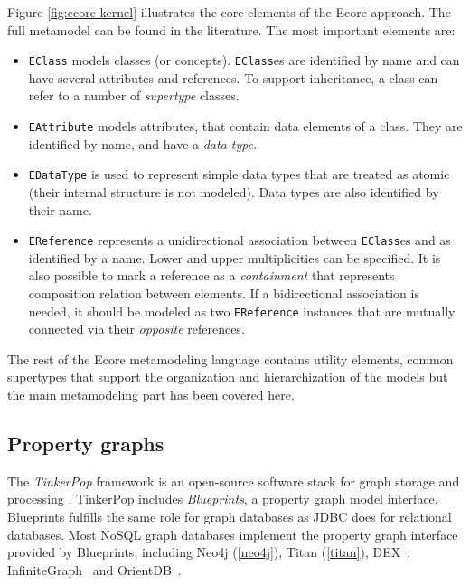 Figure \ref{fig:ecore-kernel} illustrates the core elements of the Ecore approach. The full metamodel can be found in the literature. The most important elements are:

\begin{itemize}
  \item \verb+EClass+ models classes (or concepts). \verb+EClass+es are identified by name and can have several attributes and references. To support inheritance, a class can refer to a number of \emph{supertype} classes.
  \item \verb+EAttribute+ models attributes, that contain data elements of a class. They are identified by name, and have a \emph{data type}.
  \item \verb+EDataType+ is used to represent simple data types that are treated as atomic (their internal structure is not modeled). Data types are also identified by their name.
  \item \verb+EReference+ represents a unidirectional association between \verb+EClass+es and as identified by a name. Lower and upper multiplicities can be specified. It is also possible to mark a reference as a \emph{containment} that represents composition relation between elements. If a bidirectional association is needed, it should be modeled as two \verb+EReference+ instances that are mutually connected via their \emph{opposite} references.
\end{itemize}

The rest of the Ecore metamodeling language contains utility elements, common supertypes that support the organization and hierarchization of the models but the main metamodeling part has been covered here.


\subsection{Property graphs}

The \textit{TinkerPop} framework is an open-source software stack for graph storage and processing \cite{TinkerPop}. TinkerPop includes \textit{Blueprints}, a property graph model interface. Blueprints fulfills the same role for graph databases as JDBC does for relational databases. Most NoSQL graph databases implement the property graph interface provided by Blueprints, including Neo4j (\autoref{neo4j}), Titan (\autoref{titan}), DEX~\cite{DEX}, InfiniteGraph~\cite{InfiniteGraph} and OrientDB~\cite{OrientDB}.

